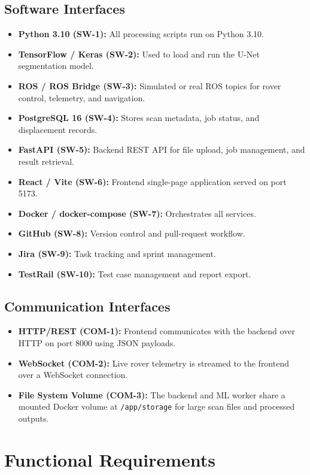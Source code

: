 \documentclass{article}
\begin{document}
\subsection{Software Interfaces}
\begin{itemize}
  \item \textbf{Python 3.10 (SW-1):} All processing scripts run on Python 3.10.
  \item \textbf{TensorFlow / Keras (SW-2):} Used to load and run the U-Net segmentation model.
  \item \textbf{ROS / ROS Bridge (SW-3):} Simulated or real ROS topics for rover control,
    telemetry, and navigation.
  \item \textbf{PostgreSQL 16 (SW-4):} Stores scan metadata, job status, and displacement
    records.
  \item \textbf{FastAPI (SW-5):} Backend REST API for file upload, job management, and result
    retrieval.
  \item \textbf{React / Vite (SW-6):} Frontend single-page application served on port 5173.
  \item \textbf{Docker / docker-compose (SW-7):} Orchestrates all services.
  \item \textbf{GitHub (SW-8):} Version control and pull-request workflow.
  \item \textbf{Jira (SW-9):} Task tracking and sprint management.
  \item \textbf{TestRail (SW-10):} Test case management and report export.
\end{itemize}

\subsection{Communication Interfaces}
\begin{itemize}
  \item \textbf{HTTP/REST (COM-1):} Frontend communicates with the backend over HTTP on port
    8000 using JSON payloads.
  \item \textbf{WebSocket (COM-2):} Live rover telemetry is streamed to the frontend over a
    WebSocket connection.
  \item \textbf{File System Volume (COM-3):} The backend and ML worker share a mounted Docker
    volume at \texttt{/app/storage} for large scan files and processed outputs.
\end{itemize}

\section{Functional Requirements}
\label{sec:functional}
\end{document}
